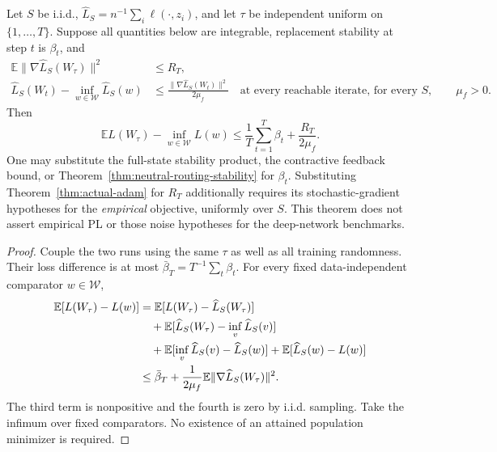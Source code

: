 \begin{theorem}
\label{thm:end-to-end-risk}
Let $S$ be i.i.d., $\widehat L_S=n^{-1}\sum_i\ell(\cdot,z_i)$, and let
$\tau$ be independent uniform on $\{1,\ldots,T\}$. Suppose all quantities
below are integrable, replacement stability at step $t$ is $\beta_t$, and
\begin{align}
 \mathbb E\|\nabla\widehat L_S(W_\tau)\|^2&\le R_T,\\
 \widehat L_S(W_t)-\inf_{w\in\mathcal W}\widehat L_S(w)
 &\le\frac{\|\nabla\widehat L_S(W_t)\|^2}{2\mu_f}
 \quad\text{at every reachable iterate, for every }S,
 \qquad\mu_f>0.
\end{align}
Then
\begin{equation}
 \mathbb E L(W_\tau)-\inf_{w\in\mathcal W}L(w)
 \le\frac1T\sum_{t=1}^T\beta_t+\frac{R_T}{2\mu_f}.
 \label{eq:closed-risk-decomposition}
\end{equation}
One may substitute the full-state stability product, the contractive
feedback bound, or Theorem~\ref{thm:neutral-routing-stability} for
$\beta_t$. Substituting Theorem~\ref{thm:actual-adam} for $R_T$ additionally
requires its stochastic-gradient hypotheses for the \emph{empirical}
objective, uniformly over $S$. This theorem does not assert empirical PL or
those noise hypotheses for the deep-network benchmarks.
\end{theorem}
\begin{proof}
Couple the two runs using the same $\tau$ as well as all training randomness.
Their loss difference is at most $\bar\beta_T=T^{-1}\sum_t\beta_t$.
For every fixed data-independent comparator $w\in\mathcal W$,
\begin{align}
 \mathbb E[L(W_\tau)-L(w)]
 &=\mathbb E[L(W_\tau)-\widehat L_S(W_\tau)]\notag\\
 &\quad+\mathbb E[\widehat L_S(W_\tau)-\inf_v\widehat L_S(v)]\notag\\
 &\quad+\mathbb E[\inf_v\widehat L_S(v)-\widehat L_S(w)]
                   +\mathbb E[\widehat L_S(w)-L(w)]\\
 &\le\bar\beta_T+\frac1{2\mu_f}
                          \mathbb E\|\nabla\widehat L_S(W_\tau)\|^2.
\end{align}
The third term is nonpositive and the fourth is zero by i.i.d. sampling.
Take the infimum over fixed comparators. No existence of an attained
population minimizer is required.
\end{proof}
